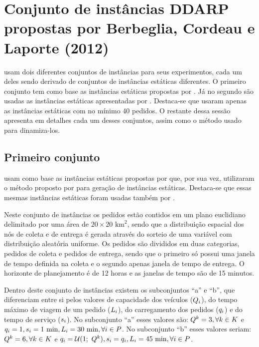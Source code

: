 \section{Conjunto de instâncias DDARP propostas por 
         Berbeglia, Cordeau e Laporte (2012)}
\label{sec:instances_berbeglia}

\textcite{berbeglia_hybrid_tabu_2012} usam dois diferentes conjuntos de 
instâncias para seus experimentos, cada um deles sendo derivado de conjuntos 
de instâncias estáticas diferentes.
O primeiro conjunto tem como base as instâncias estáticas propostas por 
\textcite{ropke_models_2007}.
Já no segundo são usadas as instâncias estáticas apresentadas por
\textcite{cordeau_tabu_2003}.
Destaca-se que \textcite{berbeglia_hybrid_tabu_2012} usaram apenas as 
instâncias estáticas com no mínimo 40 pedidos.
O restante dessa sessão apresenta em detalhes cada um desses conjuntos, assim
como o método usado para dinamiza-los.

\subsection{Primeiro conjunto}\label{sec:instances_berbeglia_1}
\textcite{berbeglia_hybrid_tabu_2012} usam como base as instâncias estáticas 
propostas por \textcite{ropke_models_2007} que, por sua vez, utilizaram o 
método proposto por \textcite{savelsbergh_drive:_1998} para geração de 
instâncias estáticas.
Destaca-se que essas mesmas instâncias estáticas foram usadas também por
\textcite{cordeau_branch-and-cut_2006}.

Neste conjunto de instâncias os pedidos estão contidos em um plano euclidiano
delimitado por uma área de $20 \times 20 \text{ km}^2$, sendo que a 
distribuição espacial dos nós de coleta e de entrega é gerada através do 
sorteio de uma variável com distribuição aleatória uniforme.
Os pedidos são divididos em duas categorias, pedidos de coleta e pedidos de
entrega, sendo que o primeiro só possui uma janela de tempo definida na coleta 
e o segundo apenas janela de tempo de entrega.
O horizonte de planejamento é de 12 horas e as janelas de tempo são de 15
minutos.

Dentro deste conjunto de instâncias existem os subconjuntos ``a'' e ``b'',
que diferenciam entre si pelos valores de capacidade dos veículos 
($Q_i$), do tempo máximo de viagem de um pedido 
($L_i$), do carregamento dos pedidos 
($q_i$) e do tempo de serviço ($s_i$).
No subconjunto ``a'' esses valores são: $Q^{k} = 3, \forall
k \in K$ e $\load_\request = 1, \serviceTime_\request = 1\ 
\text{min}, \maxRideTime_\request = 30\ \text{min}, \forall \request \in
\requests$.
No subconjunto ``b'' esses valores seriam: $Q^{k} = 6, \forall
k \in K$ e $q_i = \mathcal{U}(1;\ Q^{k}), s_i = q_i, 
L_i = 45\ \text{min}, \forall i \in P$.

